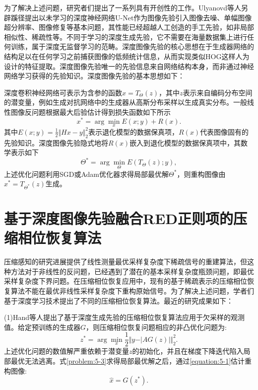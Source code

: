为了解决上述问题，研究者们提出了一系列具有开创性的工作。Ulyanovd等人另辟蹊径提出以未学习的深度神经网络U-Net作为图像先验引入图像去噪、单幅图像超分辨率、图像修复等基本问题，其性能已经超越人工创造的手工先验，如非局部相似性、稀疏性\supercite{Ulyanov,Mahendran,Tobias}等。不同于学习的深度生成先验，它不需要在海量数据集上进行任何训练，属于深度无监督学习的范畴。深度图像先验的核心思想在于生成器网络的结构足以在任何学习之前捕获图像的低频统计信息，从而实现类似HOG这样人为设计的特征提取。深度图像先验唯一的先验信息来自网络结构本身，而非通过神经网络学习获得的先验知识。深度图像先验的基本思想如下：

深度卷积神经网络可表示为含参的函数$x=T_{\Theta}(z)$，其中$z$表示来自编码分布空间的潜变量，例如生成对抗网络中的生成器从高斯分布采样以生成真实分布。一般线性图像反问题根据最大后验估计得到损失函数如下所示
\begin{equation} \label{problem:5-1}
	x^*=\arg\min_{x}E(x;y) + R(x).
\end{equation}
其中$E(x;y)=\frac{1}{2}\Vert{Hx-y}\Vert_2^2$表示退化模型的数据保真项，$R(x)$代表图像固有的先验知识。深度图像先验隐式地将$R(x)$嵌入到退化模型的数据保真项中，其数学表示如下
\begin{equation} \label{problem:5-2}
	\Theta^*=\arg\min_{\Theta}E(T_{\Theta}(z);y), 
\end{equation}
上述优化问题利用SGD或Adam优化器求得局部最优解$\Theta^*$，则重构图像由$x^*=T_{\Theta^*}(z)$生成。

\section{基于深度图像先验融合RED正则项的压缩相位恢复算法}
压缩感知的研究进展提供了线性测量最优采样复杂度下稀疏信号的重建算法，但这种方法对于非线性的反问题，已经遇到了潜在的基本采样复杂度瓶颈问题，即最优采样复杂度下界问题。在压缩相位恢复应用中，现有的基于稀疏表示的压缩相位恢复算法不能在最优非线性采样复杂度下重构原始信号。为了解决上述问题，学者们基于深度学习技术提出了不同的压缩相位恢复算法。最近的研究成果如下：

(1)Hand等人提出了基于深度生成先验的压缩相位恢复算法应用于欠采样的观测值\supercite{Hand}。给定预训练的生成器$G$，则压缩相位恢复问题相应的非凸优化问题为:
\begin{equation} \label{problem:5-3}
	z^*=\arg\min_{x}\frac{1}{2}\Vert{y-\vert{AG(z)}\vert}\Vert_2^2.
\end{equation}
上述优化问题的数值解严重依赖于潜变量$z$的初始化，并且在梯度下降迭代陷入局部最优无法逃离。式\eqref{problem:5-3}求得局部最优解之后，通过\eqref{equation:5-1}估计重构图像:
\begin{equation} \label{equation:5-1}
	\hat{x}=G(z^*).
\end{equation}

